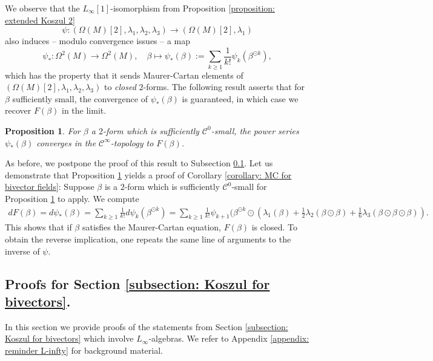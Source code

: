\documentclass[11pt,thmsa]{amsart}
\newtheorem{proposition}[theorem]{Proposition}
\theoremstyle{definition}
\begin{document}
{We observe that the $L_\infty[1]$-isomorphism from Proposition \ref{proposition: extended Koszul 2}
$$ \psi: (\Omega(M)[2],\lambda_1,\lambda_2,\lambda_3)\to (\Omega(M)[2],\lambda_1)$$
also induces -- modulo convergence issues -- a map
$$ \psi_*: \Omega^2(M) \to \Omega^2(M), \quad \beta \mapsto \psi_*(\beta):= \sum_{k \ge 1} \frac{1}{k!}\psi_k(\beta^{\odot k}),$$
which has the property that it sends Maurer-Cartan elements
of $(\Omega(M)[2],\lambda_1,\lambda_2,\lambda_3)$ to {\em closed} $2$-forms.
The following result asserts that for $\beta$ sufficiently small, the convergence of $\psi_*(\beta)$ is guaranteed, in which case we recover $F(\beta)$ in the limit.

\begin{proposition}\label{proposition: algebraic map = geometric map}
For $\beta$ a $2$-form which is sufficiently $\mathcal{C}^0$-small, the power series
$ \psi_*(\beta)$
converges in the $\mathcal{C}^\infty$-topology to $F(\beta)$.
\end{proposition}

As before, we postpone the proof of this result to Subsection \ref{subsection: proofs L-infty}. Let us demonstrate that {Proposition
\ref{proposition: algebraic map = geometric map}} yields a proof of Corollary \ref{corollary: MC for bivector fields}:
Suppose $\beta$ is a $2$-form which is sufficiently $\mathcal{C}^0$-small for Proposition \ref{proposition: algebraic map = geometric map} to apply.
We compute
\begin{eqnarray*}
dF(\beta) = d \psi_*(\beta) = \sum_{k\ge 1}\frac{1}{k!} d\psi_k(\beta^{\odot k}) = \sum_{k\ge 1} \frac{1}{k!}\psi_{k+1}(\beta^{\odot k}\odot (\lambda_1(\beta) + \frac{1}{2}\lambda_2(\beta\odot \beta) + \frac{1}{6}\lambda_3(\beta\odot \beta\odot \beta)).
\end{eqnarray*}
This shows that if $\beta$ satisfies the Maurer-Cartan equation, $F(\beta)$ is closed. To obtain the reverse implication,
one repeats the same line of arguments to the inverse of $\psi$.
 \\
 
\subsection{Proofs for Section \ref{subsection: Koszul for bivectors}.}
\label{subsection: proofs L-infty}

In this section we provide proofs of the statements from 
Section \ref{subsection: Koszul for bivectors} which involve $L_\infty$-algebras.
We refer to Appendix \ref{appendix: reminder L-infty} for background material.


}
\end{document}
